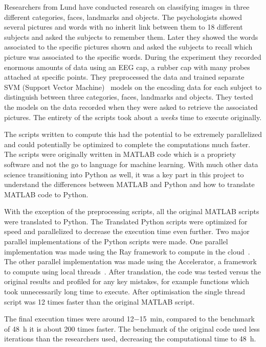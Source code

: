 \documentclass[12pt, a4paper]{article}
\begin{document}
Researchers from Lund have conducted research on classifying images in three different categories, faces, landmarks and objects.
The psychologists showed several pictures and words with no inherit link between them to 18 different subjects and asked the subjects to remember them.
Later they showed the words associated to the specific pictures shown and asked the subjects to recall which picture was associated to the specific words.
During the experiment they recorded enormous amounts of data using an EEG cap, a rubber cap with many probes attached at specific points.
They preprocessed the data and trained separate SVM (Support Vector Machine)~\cite{wiki:SVM} models on the encoding data for each subject to distinguish between three categories, faces, landmarks and objects.
They tested the models on the data recorded when they were asked to retrieve the associated pictures.
The entirety of the scripts took about a \emph{weeks} time to execute originally.\par 

The scripts written to compute this had the potential to be extremely parallelized and could potentially be optimized to complete the computations much faster.
The scripts were originally written in MATLAB code which is a propriety software and not the go to language for machine learning.
With much other data science transitioning into Python as well, it was a key part in this project to understand the differences between MATLAB and Python and how to translate MATLAB code to Python.\par

With the exception of the preprocessing scripts, all the original MATLAB scripts were translated to Python.
The Translated Python scripts were optimized for speed and parallelized to decrease the execution time even further.
Two major parallel implementations of the Python scripts were made.
One parallel implementation was made using the Ray framework to compute in the cloud~\cite{ray:whatIsRay}.
The other parallel implementation was made using the Accelerator, a framework to compute using local threads~\cite{exax:Accelerator}.
After translation, the code was tested versus the original results and profiled for any key mistakes, for example functions which took unnecessarily long time to execute.
After optimisation the single thread script was 12 times faster than the original MATLAB script.

The final execution times were around \SI[parse-numbers=false]{12-15}{\minute}, compared to the benchmark of \SI{48}{\hour} it is about 200 times faster.
The benchmark of the original code used less iterations than the researchers used, decreasing the computational time to \SI{48}{\hour}.
\end{document}
